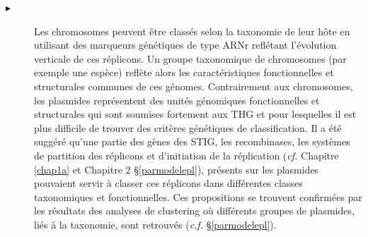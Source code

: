 \begin{description}
		 \item[$\blacktriangleright$] Les chromosomes peuvent être classés selon la taxonomie de leur hôte en utilisant des marqueurs génétiques de type ARNr reflétant l'évolution verticale de ces réplicons. Un groupe taxonomique de chromosomes (par exemple une espèce) reflète alors les caractéristiques fonctionnelles et structurales communes de ces génomes. Contrairement aux chromosomes, les plasmides représentent des unités génomiques fonctionnelles et structurales qui sont soumises fortement aux THG et pour lesquelles il est plus difficile de trouver des critères génétiques de classification. Il a été suggéré qu'une partie des gènes des STIG, les recombinases, les systèmes de partition des réplicons et d'initiation de la réplication (\textit{cf.} Chapitre \ref{chap1a} et Chapitre 2 \S \ref{parmodelepl}),  présents sur les plasmides pouvaient servir à classer ces réplicons dans différentes classes taxonomiques et fonctionnelles. Ces propositions  se trouvent confirmées par les résultats des analyses de clustering où différents groupes de plasmides, liés à la taxonomie, sont retrouvés (\textit{c.f.} \S \ref{parmodelepl}). 
\end{description}
	
	
